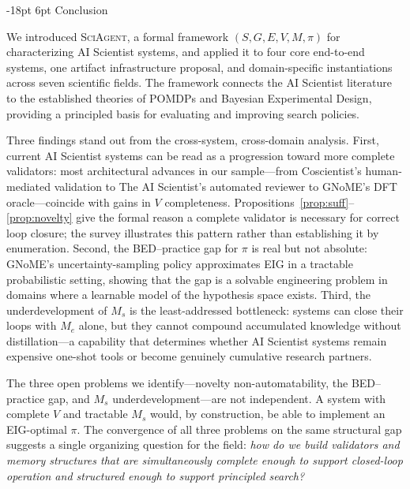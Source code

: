 \documentclass[11pt]{article}
\makeatletter
\renewcommand\section{\@startsection{section}{1}{\z@}%
  {-18pt \@plus -4pt \@minus -2pt}%
  {6pt \@plus 2pt}%
  {\normalfont\large\bfseries}}
\newcommand{\sgmvpi}{$(S, G, E, V, M, \pi)$}
\newcommand{\framework}{\textsc{SciAgent}}
\makeatother
\begin{document}
\section{Conclusion}
\label{sec:conclusion}

We introduced \framework{}, a formal framework \sgmvpi{} for characterizing AI Scientist systems, and applied it to four core end-to-end systems, one artifact infrastructure proposal, and domain-specific instantiations across seven scientific fields. The framework connects the AI Scientist literature to the established theories of POMDPs and Bayesian Experimental Design, providing a principled basis for evaluating and improving search policies.

Three findings stand out from the cross-system, cross-domain analysis. First, current AI Scientist systems can be read as a progression toward more complete validators: most architectural advances in our sample---from Coscientist's human-mediated validation to The AI Scientist's automated reviewer to GNoME's DFT oracle---coincide with gains in $V$ completeness. Propositions~\ref{prop:suff}--\ref{prop:novelty} give the formal reason a complete validator is necessary for correct loop closure; the survey illustrates this pattern rather than establishing it by enumeration. Second, the BED--practice gap for $\pi$ is real but not absolute: GNoME's uncertainty-sampling policy approximates EIG in a tractable probabilistic setting, showing that the gap is a solvable engineering problem in domains where a learnable model of the hypothesis space exists. Third, the underdevelopment of $M_s$ is the least-addressed bottleneck: systems can close their loops with $M_e$ alone, but they cannot compound accumulated knowledge without distillation---a capability that determines whether AI Scientist systems remain expensive one-shot tools or become genuinely cumulative research partners.

The three open problems we identify---novelty non-automatability, the BED--practice gap, and $M_s$ underdevelopment---are not independent. A system with complete $V$ and tractable $M_s$ would, by construction, be able to implement an EIG-optimal $\pi$. The convergence of all three problems on the same structural gap suggests a single organizing question for the field: \textit{how do we build validators and memory structures that are simultaneously complete enough to support closed-loop operation and structured enough to support principled search?}



\end{document}
